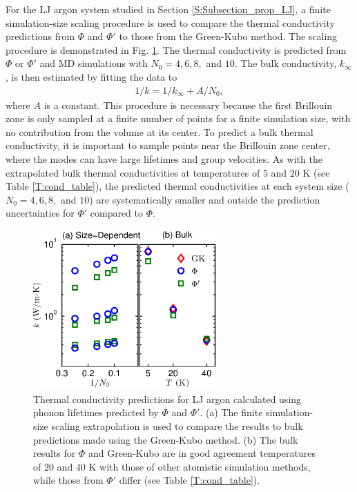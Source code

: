 \documentclass[aps,prb,preprint,superscriptaddress,amsmath,amssymb,floatfix]{revtex4}
\begin{document}
For the LJ argon system studied in Section \ref{S:Subsection_prop_LJ}, a finite simulation-size scaling procedure\cite{turney2009a,He2011} is used to compare the thermal conductivity predictions from $\Phi$ and $\Phi'$ to those from the Green-Kubo method. The scaling procedure is demonstrated in Fig$.$ \ref{F:LJ_COND}.  The thermal conductivity is predicted from $\Phi$ or $\Phi'$ and MD simulations with $N_0 = 4,6,8,$ and $10$. The bulk conductivity, $k_{\infty}$, is then estimated by fitting the data to
\begin{equation}\label{k_size}
\begin{split}
1/k = 1/k_{\infty} + A/N_0,
 \end{split}
\end{equation}
where $A$ is a constant. This procedure is necessary because the first Brillouin zone is only sampled at a finite number of points for a finite simulation size, with no contribution from the volume at its center. To predict a bulk thermal conductivity, it is important to sample points near the Brillouin zone center, where the modes can have large lifetimes and group velocities.\cite{turney2009a,sellan2010b} As with the extrapolated bulk thermal conductivities at temperatures of $5$ and $20$ K (see Table \ref{T:cond_table}), the predicted thermal conductivities at each system size ($N_0=4,6,8,$ and $10$) are systematically smaller and outside the prediction uncertainties for $\Phi'$ compared to $\Phi$.

\begin{figure}
\includegraphics[angle=0,width=70.0mm]{LJ_NMD_SED_COND_2.eps}
\caption{\label{F:LJ_COND} Thermal conductivity predictions for LJ argon calculated using phonon lifetimes predicted by $\Phi$ and $\Phi'$. (a) The finite simulation-size scaling extrapolation \cite{turney2009a,He2011} is used to compare the results to bulk predictions made using the Green-Kubo method. (b) The bulk results for $\Phi$ and Green-Kubo are in good agreement temperatures of $20$ and $40$ K with those of other atomistic simulation methods,\cite{turney2009a} while those from $\Phi'$ differ (see Table \ref{T:cond_table}).}
\end{figure}

\vspace*{80mm}




\end{document}
